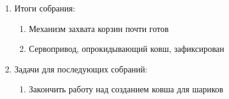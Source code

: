 \begin{enumerate}
\begin{enumerate}
	\end{enumerate}
	
	\item Итоги собрания:
	\begin{enumerate}
		\item Механизм захвата корзин почти готов
		
		\item Сервопривод, опрокидывающий ковш, зафиксирован
		
	\end{enumerate}
	
	\item Задачи для последующих собраний:
	\begin{enumerate}
		\item Закончить работу над созданием ковша для шариков
		
	\end{enumerate}     
\end{enumerate}
\fillpage

